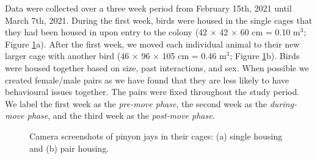 \documentclass[
  pub]{apa6}
\begin{document}
Data were collected over a three week period from February 15th, 2021 until March 7th, 2021. During the first week, birds were housed in the single cages that they had been housed in upon entry to the colony (42 × 42 × 60 cm = 0.10 m\(^{3}\); Figure \ref{fig:cage-fig}a). After the first week, we moved each individual animal to their new larger cage with another bird (46 × 96 × 105 cm = 0.46 m\(^{3}\); Figure \ref{fig:cage-fig}b). Birds were housed together based on size, past interactions, and sex. When possible we created female/male pairs as we have found that they are less likely to have behavioural issues together. The pairs were fixed throughout the study period. We label the first week as the \emph{pre-move phase}, the second week as the \emph{during-move phase}, and the third week as the \emph{post-move phase}.



\begin{figure}

{\centering {}\newline{}\newline

}

\caption{Camera screenshots of pinyon jays in their cages: (a) single housing and (b) pair housing.}\label{fig:cage-fig}
\end{figure}
\end{document}
